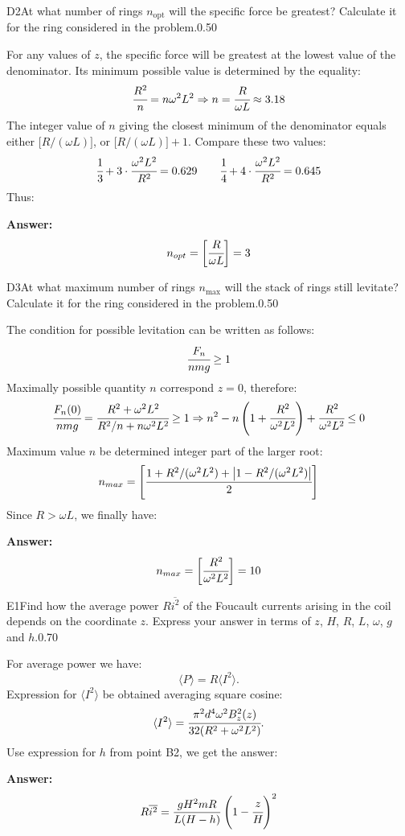 \documentclass[11pt,a4paper]{article}
\begin{document}
\begin{solcard}{D2}{At what number of rings $n_\mathrm{opt}$ will the specific force be greatest? Calculate it for the ring considered in the problem.}{0.50}

For any values of $z$, the specific force will be greatest at the lowest value of the denominator. Its minimum possible value is determined by the equality: $$\cfrac{R^2}{n}=n\omega^2L^2\Rightarrow n=\cfrac{R}{\omega L}\approx 3{.}18 $$The integer value of $n$ giving the closest minimum of the denominator equals either $\bigl[R/(\omega L)\bigr]$, or $\bigl[R/(\omega L)\bigr]+1$. Compare these two values: $$\cfrac{1}{3}+3\cdot\cfrac{\omega^2L^2}{R^2}=0{.}629\qquad \cfrac{1}{4}+4\cdot\cfrac{\omega^2L^2}{R^2}=0{.}645 $$Thus:

\par\smallskip\noindent\textbf{Answer:} $$n_{opt}=\biggl[\cfrac{R}{\omega L}\biggr]=3 $$
\end{solcard}

\begin{solcard}{D3}{At what maximum number of rings $n_\mathrm{max}$ will the stack of rings still levitate? Calculate it for the ring considered in the problem.}{0.50}

The condition for possible levitation can be written as follows: $$\cfrac{F_n}{nmg}\geq 1 $$Maximally possible quantity $n$ correspond $z=0$, therefore: $$\cfrac{F_n(0)}{nmg}=\cfrac{R^2+\omega^2L^2}{R^2/n+n\omega^2L^2}\geq 1\Rightarrow n^2-n\left(1+\cfrac{R^2}{\omega^2L^2}\right)+\cfrac{R^2}{\omega^2L^2}\leq 0 $$Maximum value $n$ be determined integer part of the larger root: $$n_{max}=\Biggl[\cfrac{1+R^2/(\omega^2L^2)+\left|1-R^2/(\omega^2L^2)\right|}{2}\Biggr] $$Since $R>\omega L$, we finally have:

\par\smallskip\noindent\textbf{Answer:} $$n_{max}=\biggl[\cfrac{R^2}{\omega^2L^2}\biggr]=10 $$
\end{solcard}

\begin{solcard}{E1}{Find how the average power $R\overline{i^2}$ of the Foucault currents arising in the coil depends on the coordinate $z$. Express your answer in terms of $z$, $H$, $R$, $L$, $\omega$, $g$ and $h$.}{0.70}

For average power we have: $$\langle P\rangle=R\langle I^2\rangle. $$ Expression for $\langle I^2\rangle$ be obtained averaging square cosine: $$\langle I^2\rangle=\cfrac{\pi^2d^4\omega^2B^2_z(z)}{32(R^2+\omega^2L^2)}. $$ Use expression for $h$ from point B2, we get the answer:

\par\smallskip\noindent\textbf{Answer:} $$R\overline{i^2}= \frac{gH^2mR}{L(H-h)}\left(1-\cfrac{z}{H}\right)^2 $$
\end{solcard}
\end{document}

